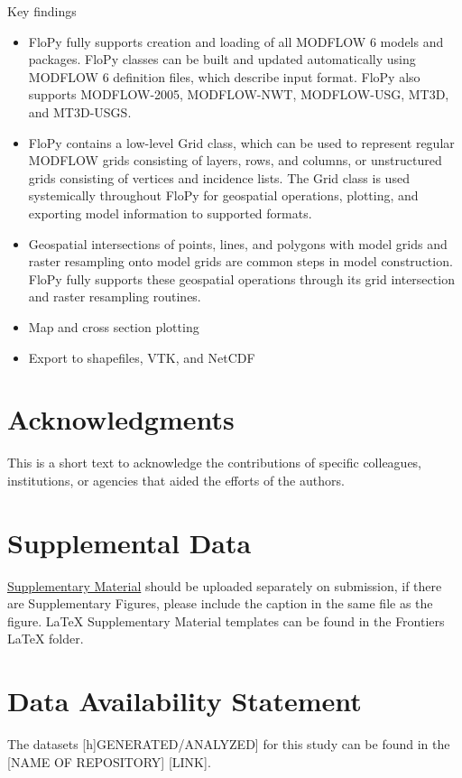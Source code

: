 \documentclass[11pt, oneside]{article}   	%
\begin{document}
Key findings

\begin{itemize}
\item FloPy fully supports creation and loading of all MODFLOW 6 models and packages.  FloPy classes can be built and updated automatically using MODFLOW 6 definition files, which describe input format.  FloPy also supports MODFLOW-2005, MODFLOW-NWT, MODFLOW-USG, MT3D, and MT3D-USGS.
\item FloPy contains a low-level Grid class, which can be used to represent regular MODFLOW grids consisting of layers, rows, and columns, or unstructured grids consisting of vertices and incidence lists.  The Grid class is used systemically throughout FloPy for geospatial operations, plotting, and exporting model information to supported formats.
\item Geospatial intersections of points, lines, and polygons with model grids and raster resampling onto model grids are common steps in model construction.  FloPy fully supports these geospatial operations through its grid intersection and raster resampling routines.  
\item Map and cross section plotting
\item Export to shapefiles, VTK, and NetCDF
\end{itemize}


\section*{Acknowledgments}
This is a short text to acknowledge the contributions of specific colleagues, institutions, or agencies that aided the efforts of the authors.

\section*{Supplemental Data}
 \href{http://home.frontiersin.org/about/author-guidelines#SupplementaryMaterial}{Supplementary Material} should be uploaded separately on submission, if there are Supplementary Figures, please include the caption in the same file as the figure. LaTeX Supplementary Material templates can be found in the Frontiers LaTeX folder.

\section*{Data Availability Statement}
The datasets [h]GENERATED/ANALYZED] for this study can be found in the [NAME OF REPOSITORY] [LINK].

 

\end{document}
